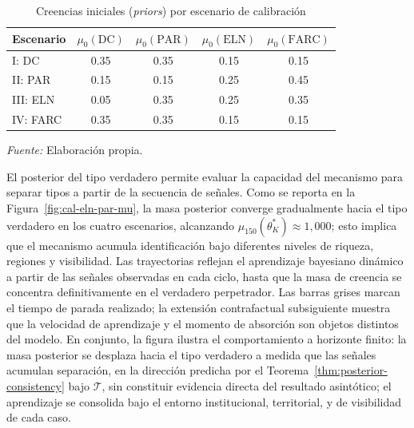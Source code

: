\documentclass[review,authoryear,12pt]{elsarticle}
\theoremstyle{plain}
\theoremstyle{definition}
\newcommand{\1}{\mathbf{1}}
\begin{document}
\begin{table}[htbp]
\centering
\small
\caption{Creencias iniciales (\emph{priors}) por escenario de calibración}
\label{tab:priors-escenarios}
\begin{tabular}{lcccc}
\toprule
Escenario & $\mu_0(\mathrm{DC})$ & $\mu_0(\mathrm{PAR})$ & $\mu_0(\mathrm{ELN})$ & $\mu_0(\mathrm{FARC})$ \\ \midrule
I: DC & 0.35 & 0.35 & 0.15 & 0.15 \\
II: PAR & 0.15 & 0.15 & 0.25 & 0.45 \\
III: ELN & 0.05 & 0.35 & 0.25 & 0.35 \\
IV: FARC & 0.35 & 0.35 & 0.15 & 0.15 \\ \bottomrule
\end{tabular}
\par\smallskip\footnotesize \textit{Fuente:} Elaboración propia.
\end{table}

El posterior del tipo verdadero permite evaluar la capacidad del mecanismo para separar tipos a partir de la secuencia de señales. Como se reporta en la Figura~\ref{fig:cal-eln-par-mu}, la masa posterior converge gradualmente hacia el tipo verdadero en los cuatro escenarios, alcanzando $\mu_{150}(\theta_K^\ast)\approx 1{,}000$; esto implica que el mecanismo acumula identificación bajo diferentes niveles de riqueza, regiones y visibilidad. Las trayectorias reflejan el aprendizaje bayesiano dinámico a partir de las señales observadas en cada ciclo, hasta que la masa de creencia se concentra definitivamente en el verdadero perpetrador. Las barras grises marcan el tiempo de parada realizado; la extensión contrafactual subsiguiente muestra que la velocidad de aprendizaje y el momento de absorción son objetos distintos del modelo. En conjunto, la figura ilustra el comportamiento a horizonte finito: la masa posterior se desplaza hacia el tipo verdadero a medida que las señales acumulan separación, en la dirección predicha por el Teorema~\ref{thm:posterior-consistency} bajo $\mathcal{T}$, sin constituir evidencia directa del resultado asintótico; el aprendizaje se consolida bajo el entorno institucional, territorial, y de visibilidad de cada caso.
\end{document}
